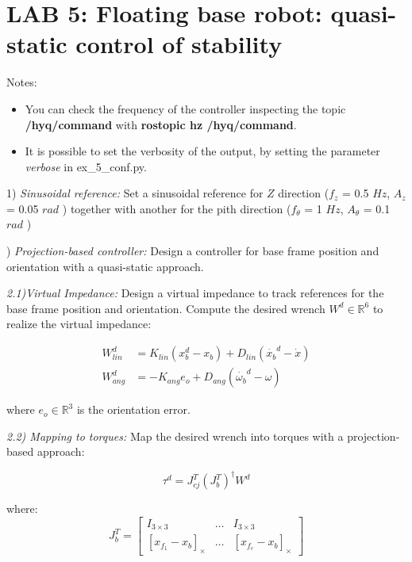 \documentclass{report}
\newcommand{\Rnum}{\mathbb{R}} %
\newcommand{\mat}[1]{\ensuremath{\begin{bmatrix}#1\end{bmatrix}}}	%
\begin{document}
\section*{LAB 5: Floating base robot: quasi-static control of stability}

Notes:
\begin{itemize}
	\item You can check the frequency of the controller inspecting the topic \textbf{/hyq/command} with \textbf{rostopic hz /hyq/command}.
	\item It is possible to set the verbosity of the output, by setting the parameter  \textit{verbose} in  ex\_5\_conf.py.
\end{itemize}

1) \textit{Sinusoidal reference:} 
Set a sinusoidal reference for $Z$ direction ($f_z$ = 0.5 $Hz$, $A_z$ = 0.05 $rad$ )
together with another for the pith direction ($f_{\theta}$ = 1 $Hz$, $A_{\theta}$ = 0.1 $rad$ )

\quad
 
) \textit{Projection-based controller:} 
Design a controller for base frame position and orientation with a quasi-static approach.

 \textit{2.1)Virtual Impedance:}
Design a virtual impedance to track  references for the base frame position and orientation. Compute the desired wrench $W^d \in\Rnum^6$ to realize the virtual impedance:

\begin{align}
W^d_{lin} &= K_{lin} (x^d_b - x_b ) + D_{lin} (\dot{x_b}^d - \dot{x})   \\
W^d_{ang} &=  - K_{ang} e_o + D_{ang} (\dot{\omega_b}^d - \omega)
\end{align}

where $e_o \in \Rnum^3$ is the orientation error. 

\textit{2.2) Mapping to torques:}
Map the desired wrench into torques  with a projection-based approach:

\begin{equation}
\tau^d = J_{cj}^T(J_b^T)^{\dagger} W^d
\end{equation}

where:
\begin{equation}
J_b^T = \mat{I_{3\times3} & \dots & I_{3\times3} \\
			[x_{f_1} - x_b]_{\times} & \dots & [x_{f_c} - x_b]_{\times}}
\label{eq:newton-euler}
\end{equation}
\end{document}
